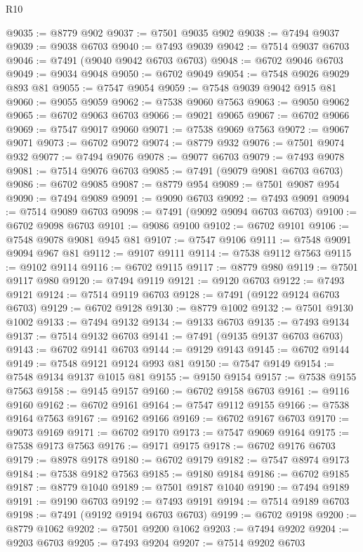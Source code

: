 \begin{lexlean}{R10}
\begin{coremodule}
@9035 := @8779 @902
@9037 := @7501 @9035 @902
@9038 := @7494 @9037
@9039 := @9038 @6703
@9040 := @7493 @9039
@9042 := @7514 @9037 @6703
@9046 := @7491 (@9040 @9042 @6703 @6703)
@9048 := @6702 @9046 @6703
@9049 := @9034 @9048
@9050 := @6702 @9049
@9054 := @7548 @9026 @9029 @893 @81
@9055 := @7547 @9054
@9059 := @7548 @9039 @9042 @915 @81
@9060 := @9055 @9059
@9062 := @7538 @9060 @7563
@9063 := @9050 @9062
@9065 := @6702 @9063 @6703
@9066 := @9021 @9065
@9067 := @6702 @9066
@9069 := @7547 @9017 @9060
@9071 := @7538 @9069 @7563
@9072 := @9067 @9071
@9073 := @6702 @9072
@9074 := @8779 @932
@9076 := @7501 @9074 @932
@9077 := @7494 @9076
@9078 := @9077 @6703
@9079 := @7493 @9078
@9081 := @7514 @9076 @6703
@9085 := @7491 (@9079 @9081 @6703 @6703)
@9086 := @6702 @9085
@9087 := @8779 @954
@9089 := @7501 @9087 @954
@9090 := @7494 @9089
@9091 := @9090 @6703
@9092 := @7493 @9091
@9094 := @7514 @9089 @6703
@9098 := @7491 (@9092 @9094 @6703 @6703)
@9100 := @6702 @9098 @6703
@9101 := @9086 @9100
@9102 := @6702 @9101
@9106 := @7548 @9078 @9081 @945 @81
@9107 := @7547 @9106
@9111 := @7548 @9091 @9094 @967 @81
@9112 := @9107 @9111
@9114 := @7538 @9112 @7563
@9115 := @9102 @9114
@9116 := @6702 @9115
@9117 := @8779 @980
@9119 := @7501 @9117 @980
@9120 := @7494 @9119
@9121 := @9120 @6703
@9122 := @7493 @9121
@9124 := @7514 @9119 @6703
@9128 := @7491 (@9122 @9124 @6703 @6703)
@9129 := @6702 @9128
@9130 := @8779 @1002
@9132 := @7501 @9130 @1002
@9133 := @7494 @9132
@9134 := @9133 @6703
@9135 := @7493 @9134
@9137 := @7514 @9132 @6703
@9141 := @7491 (@9135 @9137 @6703 @6703)
@9143 := @6702 @9141 @6703
@9144 := @9129 @9143
@9145 := @6702 @9144
@9149 := @7548 @9121 @9124 @993 @81
@9150 := @7547 @9149
@9154 := @7548 @9134 @9137 @1015 @81
@9155 := @9150 @9154
@9157 := @7538 @9155 @7563
@9158 := @9145 @9157
@9160 := @6702 @9158 @6703
@9161 := @9116 @9160
@9162 := @6702 @9161
@9164 := @7547 @9112 @9155
@9166 := @7538 @9164 @7563
@9167 := @9162 @9166
@9169 := @6702 @9167 @6703
@9170 := @9073 @9169
@9171 := @6702 @9170
@9173 := @7547 @9069 @9164
@9175 := @7538 @9173 @7563
@9176 := @9171 @9175
@9178 := @6702 @9176 @6703
@9179 := @8978 @9178
@9180 := @6702 @9179
@9182 := @7547 @8974 @9173
@9184 := @7538 @9182 @7563
@9185 := @9180 @9184
@9186 := @6702 @9185
@9187 := @8779 @1040
@9189 := @7501 @9187 @1040
@9190 := @7494 @9189
@9191 := @9190 @6703
@9192 := @7493 @9191
@9194 := @7514 @9189 @6703
@9198 := @7491 (@9192 @9194 @6703 @6703)
@9199 := @6702 @9198
@9200 := @8779 @1062
@9202 := @7501 @9200 @1062
@9203 := @7494 @9202
@9204 := @9203 @6703
@9205 := @7493 @9204
@9207 := @7514 @9202 @6703

\end{coremodule}
\end{lexlean}
